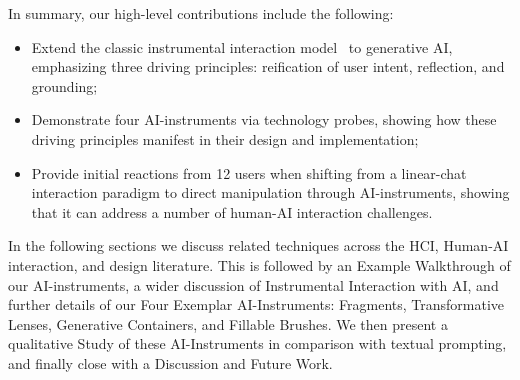 In summary, our high-level contributions include the following:
\begin{itemize}
    \item Extend the classic instrumental interaction model~\cite{beaudouin2000instrumental} to generative AI, emphasizing three driving principles: reification of user intent, reflection, and grounding;
    \item Demonstrate four AI-instruments via technology probes, showing how these driving principles manifest in their design and implementation;
    \item Provide initial reactions from 12 users when shifting from a linear-chat interaction paradigm to direct manipulation through AI-instruments, showing that it can address a number of human-AI interaction challenges.
\end{itemize}

In the following sections we discuss related techniques across the HCI, Human-AI interaction, and design literature. This is followed by an Example Walkthrough of our AI-instruments, a wider discussion of Instrumental Interaction with AI, and further details of our Four Exemplar AI-Instruments: Fragments, Transformative Lenses, Generative Containers, and Fillable Brushes. We then present a qualitative Study of these AI-Instruments in comparison with textual prompting, and finally close with a Discussion and Future Work.




